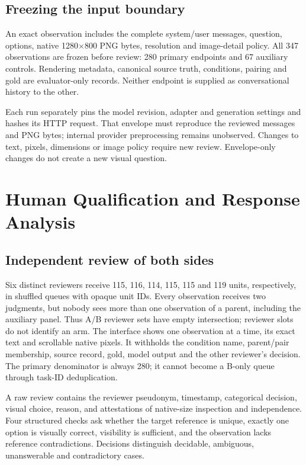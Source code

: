 \documentclass[10pt,twocolumn,letterpaper]{article}
\begin{document}
\subsection{Freezing the input boundary}
An exact observation includes the complete system/user messages,
question, options, native 1280$\times$800 PNG bytes, resolution and
image-detail policy. All 347 observations are frozen before review:
280 primary endpoints and 67 auxiliary controls. Rendering metadata,
canonical source truth, conditions, pairing and gold are evaluator-only
records. Neither endpoint is supplied as conversational history to the
other.

Each run separately pins the model revision, adapter and generation
settings and hashes its HTTP request. That envelope must reproduce the
reviewed messages and PNG bytes; internal provider preprocessing remains
unobserved. Changes to text, pixels, dimensions or image policy require
new review. Envelope-only changes do not create a new visual question.

\section{Human Qualification and Response Analysis}
\subsection{Independent review of both sides}
Six distinct reviewers receive 115, 116, 114, 115, 115 and 119 units,
respectively, in shuffled queues with opaque unit IDs. Every observation
receives two judgments, but nobody sees more than one observation of
a parent, including the auxiliary panel. Thus A/B reviewer sets have
empty intersection; reviewer slots do not identify an arm. The interface
shows one observation at a time, its exact text and scrollable native
pixels. It withholds the condition name, parent/pair membership,
source record, gold, model output and the other reviewer's decision.
The primary denominator is always 280; it cannot become a B-only
queue through task-ID deduplication.

A raw review contains the reviewer pseudonym, timestamp, categorical
decision, visual choice, reason, and attestations of native-size
inspection and independence. Four structured checks ask whether
the target reference is unique, exactly one option is visually correct,
visibility is sufficient, and the observation lacks reference
contradictions. Decisions distinguish decidable, ambiguous,
unanswerable and contradictory cases.
\end{document}
